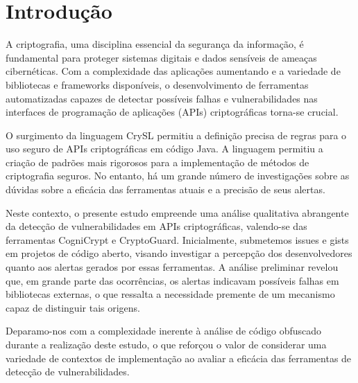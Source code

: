 

\section{Introdução}%

A criptografia, uma disciplina essencial da segurança da informação, é fundamental para proteger sistemas digitais e dados sensíveis de ameaças cibernéticas. Com a complexidade das aplicações aumentando e a variedade de bibliotecas e frameworks disponíveis, o desenvolvimento de ferramentas automatizadas capazes de detectar possíveis falhas e vulnerabilidades nas interfaces de programação de aplicações (APIs) criptográficas torna-se crucial.

O surgimento da linguagem CrySL permitiu a definição precisa de regras para o uso seguro de APIs criptográficas em código Java. A linguagem permitiu a criação de padrões mais rigorosos para a implementação de métodos de criptografia seguros. No entanto, há um grande número de investigações sobre as dúvidas sobre a eficácia das ferramentas atuais e a precisão de seus alertas.

Neste contexto, o presente estudo empreende uma análise qualitativa abrangente da detecção de vulnerabilidades em APIs criptográficas, valendo-se das ferramentas CogniCrypt e CryptoGuard. Inicialmente, submetemos issues e gists em projetos de código aberto, visando investigar a percepção dos desenvolvedores quanto aos alertas gerados por essas ferramentas. A análise preliminar revelou que, em grande parte das ocorrências, os alertas indicavam possíveis falhas em bibliotecas externas, o que ressalta a necessidade premente de um mecanismo capaz de distinguir tais origens.

Deparamo-nos com a complexidade inerente à análise de código obfuscado durante a realização deste estudo, o que reforçou o valor de considerar uma variedade de contextos de implementação ao avaliar a eficácia das ferramentas de detecção de vulnerabilidades.


